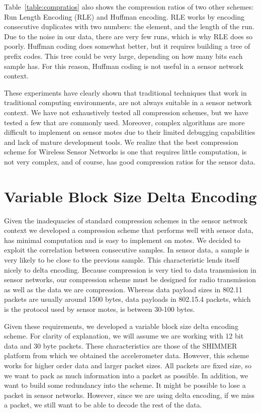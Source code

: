 Table~\ref{table:compratios} also shows the compression ratios of two
other schemes: Run Length Encoding (RLE) and Huffman encoding. RLE
works by encoding consecutive duplicates with two numbers: the
element, and the length of the run. Due to the noise in our data,
there are very few runs, which is why RLE does so poorly. Huffman
coding does somewhat better, but it requires building a tree of prefix
codes. This tree could be very large, depending on how many bits each
sample has. For this reason, Huffman coding is not useful in a sensor
network context. 

These experiments have clearly shown that traditional techniques that
work in traditional computing environments, are not always suitable in
a sensor network context. We have not exhaustively tested all
compression schemes, but we have tested a few that are commonly
used. Moreover, complex algorithms are more difficult to implement on
sensor motes due to their limited debugging capabilities and lack of
mature development tools. We realize that the best compression scheme
for Wireless Sensor Networks is one that requires little computation,
is not very complex, and of course, has good compression ratios for
the sensor data.

\section{Variable Block Size Delta Encoding}

Given the inadequacies of standard compression schemes in the sensor
network context we developed a compression scheme that performs well
with sensor data, has minimal computation and is easy to implement on
motes. We decided to exploit the correlation between consecutive
samples. In sensor data, a sample is very likely to be close to the
previous sample. This characteristic lends itself nicely to delta
encoding. Because compression is very tied to data transmission in
sensor networks, our compression scheme must be designed for radio
transmission as well as the data we are compression. Whereas data
payload sizes in 802.11 packets are usually around 1500 bytes, data
payloads in 802.15.4 packets, which is the protocol used by sensor
motes, is between 30-100 bytes.

Given these requirements, we developed a variable block size delta
encoding scheme. For clarity of explanation, we will assume we are
working with 12 bit data and 30 byte packets. These characteristics
are those of the SHIMMER platform from which we obtained the
accelerometer data. However, this scheme works for higher order data
and larger packet sizes. All packets are fixed size, so we want to pack
as much information into a packet as possible. In addition, we want to
build some redundancy into the scheme. It might be possible to lose a
packet in sensor networks. However, since we are using delta encoding,
if we miss a packet, we still want to be able to decode the rest of
the data.

